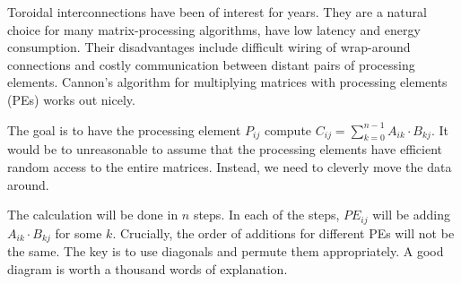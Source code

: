 \documentclass[12pt,a4paper,twoside,openright]{report}
\begin{document}
Toroidal interconnections have been of interest for years. They are a natural choice for many matrix-processing algorithms, have low latency and energy consumption. Their disadvantages include difficult wiring of wrap-around connections and costly communication between distant pairs of processing elements. Cannon's algorithm\cite{cannon} for multiplying matrices with processing elements (PEs) works out nicely.

The goal is to have the processing element $P_{ij}$ compute $C_{ij}=\sum_{k=0}^{n-1} A_{ik}\cdot B_{kj}$. It would be to unreasonable to assume that the processing elements have efficient random access to the entire matrices. Instead, we need to cleverly move the data around.

The calculation will be done in $n$ steps. In each of the steps, $PE_{ij}$ will be adding $A_{ik}\cdot B_{kj}$ for some $k$. Crucially, the order of additions for different PEs will not be the same. The key is to use diagonals and permute them appropriately. A good diagram is worth a thousand words of explanation. 
\end{document}
